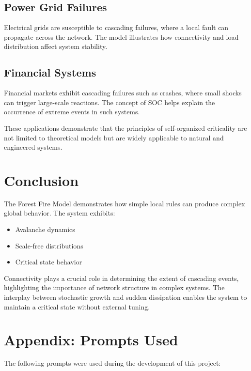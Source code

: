 \documentclass[12pt,a4paper]{article}
\begin{document}
\subsection{Power Grid Failures}

Electrical grids are susceptible to cascading failures, where a local fault can propagate across the network. The model illustrates how connectivity and load distribution affect system stability.

\subsection{Financial Systems}

Financial markets exhibit cascading failures such as crashes, where small shocks can trigger large-scale reactions. The concept of SOC helps explain the occurrence of extreme events in such systems.

\bigskip

These applications demonstrate that the principles of self-organized criticality are not limited to theoretical models but are widely applicable to natural and engineered systems.

\section{Conclusion}

The Forest Fire Model demonstrates how simple local rules can produce complex global behavior. The system exhibits:

\begin{itemize}
\item Avalanche dynamics
\item Scale-free distributions
\item Critical state behavior
\end{itemize}

Connectivity plays a crucial role in determining the extent of cascading events, highlighting the importance of network structure in complex systems. The interplay between stochastic growth and sudden dissipation enables the system to maintain a critical state without external tuning.

\section{Appendix: Prompts Used}

The following prompts were used during the development of this project:
\end{document}
